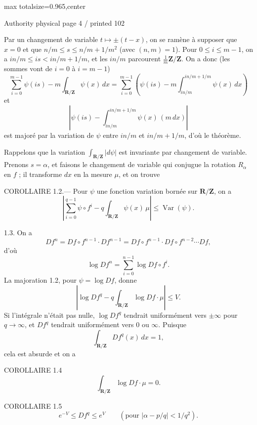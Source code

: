 \documentclass{article}
\begin{document}
\newpage
\noindent\begin{adjustbox}{max totalsize={\textwidth}{0.965\textheight},center}\begin{minipage}{\textwidth}
\noindent\hfill\scriptsize Authority physical page 4 / printed 102\par\normalsize
Par un changement de variable \(t\longmapsto\pm(t-x)\), on se ramène à supposer que \(x=0\) et que \(n/m\leq s\leq n/m+1/m^2\) (avec \((n,m)=1\)). Pour \(0\leq i\leq m-1\), on a \(in/m\leq is<in/m+1/m\), et les \(in/m\) parcourent \(\frac1m\mathbf Z/\mathbf Z\). On a donc (les sommes vont de \(i=0\) à \(i=m-1\))
\[
\sum_{i=0}^{m-1}\psi(is)-m\int_{\mathbf R/\mathbf Z}\psi(x)\,dx
=\sum_{i=0}^{m-1}\left(\psi(is)-m\int_{in/m}^{in/m+1/m}\psi(x)\,dx\right)
\]
et
\[
\left|\psi(is)-\int_{in/m}^{in/m+1/m}\psi(x)\,(m\,dx)\right|
\]
est majoré par la variation de \(\psi\) entre \(in/m\) et \(in/m+1/m\), d’où le théorème.

Rappelons que la variation \(\int_{\mathbf R/\mathbf Z}|d\psi|\) est invariante par changement de variable. Prenons \(s=\alpha\), et faisons le changement de variable qui conjugue la rotation \(R_\alpha\) en \(f\) ; il transforme \(dx\) en la mesure \(\mu\), et on trouve

COROLLAIRE 1.2.— Pour \(\psi\) une fonction variation bornée sur \(\mathbf R/\mathbf Z\), on a
\[
\left|\sum_{i=0}^{q-1}\psi\circ f^i-q\int_{\mathbf R/\mathbf Z}\psi(x)\,\mu\right|\leq\operatorname{Var}(\psi).
\]

1.3. On a
\[
Df^n=Df\circ f^{n-1}\cdot Df^{n-1}
=Df\circ f^{n-1}\cdot Df\circ f^{n-2}\cdots Df,
\]
d’où
\[
\tag{1.3.1}\log Df^n=\sum_{i=0}^{n-1}\log Df\circ f^i.
\]
La majoration 1.2, pour \(\psi=\log Df\), donne
\[
\left|\log Df^q-q\int_{\mathbf R/\mathbf Z}\log Df\cdot\mu\right|\leq V.
\]
Si l’intégrale n’était pas nulle, \(\log Df^q\) tendrait uniformément vers \(\pm\infty\) pour \(q\to\infty\), et \(Df^q\) tendrait uniformément vers \(0\) ou \(\infty\). Puisque
\[
\int_{\mathbf R/\mathbf Z}Df^q(x)\,dx=1,
\]
cela est absurde et on a

COROLLAIRE 1.4
\[
\int_{\mathbf R/\mathbf Z}\log Df\cdot\mu=0.
\]

COROLLAIRE 1.5
\[
e^{-V}\leq Df^q\leq e^V\qquad\left(\text{pour }|\alpha-p/q|<1/q^2\right).
\]
\end{minipage}\end{adjustbox}
\end{document}
